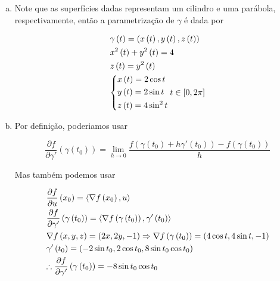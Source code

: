 \documentclass{book}
\begin{document}
\begin{sol}
\begin{enumerate}[(a)]
  \item Note que as superf\'icies dadas representam um cilindro e uma par\'abola, respectivamente, ent\~ao a parametriza\c{c}\~ao de $\gamma$ \'e dada por

\[
\begin{gathered}
  \gamma \left( t \right) = \left( {x\left( t \right),y\left( t \right),z\left( t \right)} \right) \hfill \\
  x^2 \left( t \right) + y^2 \left( t \right) = 4 \hfill \\
  z\left( t \right) = y^2 \left( t \right) \hfill \\
  \left\{ \begin{gathered}
  x\left( t \right) = 2\cos t \hfill \\
  y\left( t \right) = 2\sin t \hfill \\
  z\left( t \right) = 4\sin ^2 t \hfill \\
\end{gathered}  \right.t \in \left[ {0,2\pi } \right] \hfill \\
\end{gathered}
\]

  \item Por defini\c{c}\~ao, poderiamos usar

\[
\frac{{\partial f}}
{{\partial \gamma '}}\left( {\gamma \left( {t_0 } \right)} \right) = \mathop {\lim }\limits_{h \to 0} \frac{{f\left( {\gamma \left( {t_0 } \right) + h\gamma '\left( {t_0 } \right)} \right) - f\left( {\gamma \left( {t_0 } \right)} \right)}}
{h}
\]

Mas tamb\'em podemos usar

\[
\begin{gathered}
  \frac{{\partial f}}
{{\partial u}}\left( {x_0 } \right) = \left\langle {\nabla f\left( {x_0 } \right),u} \right\rangle  \hfill \\
  \frac{{\partial f}}
{{\partial \gamma '}}\left( {\gamma \left( {t_0 } \right)} \right) = \left\langle {\nabla f\left( {\gamma \left( {t_0 } \right)} \right),\gamma '\left( {t_0 } \right)} \right\rangle  \hfill \\
  \nabla f\left( {x,y,z} \right) = \left( {2x,2y, - 1} \right) \Rightarrow \nabla f\left( {\gamma \left( {t_0 } \right)} \right) = \left( {4\cos t,4\sin t, - 1} \right) \hfill \\
  \gamma '\left( {t_0 } \right) = \left( { - 2\sin t_0 ,2\cos t_0 ,8\sin t_0 \cos t_0 } \right) \hfill \\
  \therefore \frac{{\partial f}}
{{\partial \gamma '}}\left( {\gamma \left( {t_0 } \right)} \right) =  - 8\sin t_0 \cos t_0  \hfill \\
\end{gathered}
\]



\end{enumerate}
\end{sol}
\end{document}
